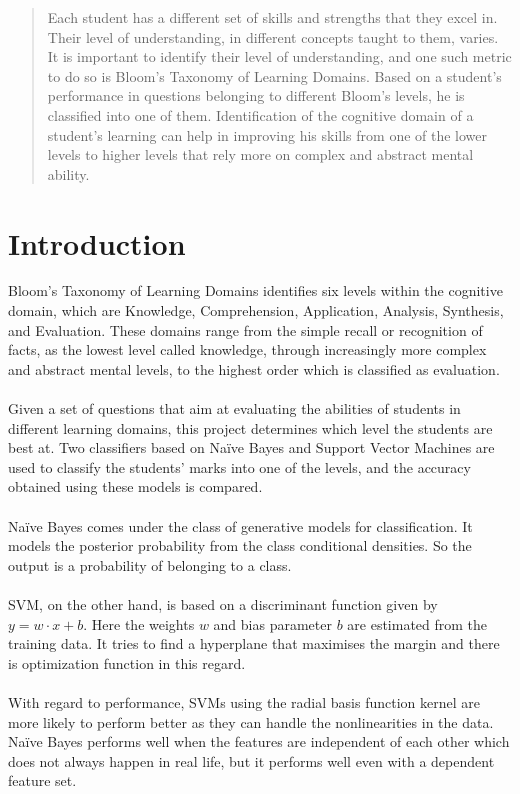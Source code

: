 \documentclass[12pt,oneside,a4paper]{article}
\providecommand\phantomsection{}
\begin{document}
	\null
	\vspace{\fill}

	\phantomsection
	\begin{abstract}
		\normalsize
		\doublespacing
		Each student has a different set of skills and strengths that they excel in. Their level of understanding, in different concepts taught to them, varies. It is important to identify their level of understanding, and one such metric to do so is Bloom's Taxonomy of Learning Domains. Based on a student's performance in questions belonging to different Bloom's levels, he is classified into one of them. Identification of the cognitive domain of a student's learning can help in improving his skills from one of the lower levels to higher levels that rely more on complex and abstract mental ability.
	\end{abstract}

	\vspace{\fill}
	\null
	\newpage

	\section{Introduction}
		Bloom's Taxonomy of Learning Domains identifies six levels within the cognitive domain, which are Knowledge, Comprehension, Application, Analysis, Synthesis, and Evaluation. These domains range from the simple recall or recognition of facts, as the lowest level called knowledge, through increasingly more complex and abstract mental levels, to the highest order which is classified as evaluation. \\
		\\
		Given a set of questions that aim at evaluating the abilities of students in different learning domains, this project determines which level the students are best at. Two classifiers based on Na\"ive Bayes and Support Vector Machines are used to classify the students' marks into one of the levels, and the accuracy obtained using these models is compared. \\
		\\
		Na\"ive Bayes comes under the class of generative models for classification. It models the posterior probability from the class conditional densities. So the output is a probability of belonging to a class. \\
		\\
		SVM, on the other hand, is based on a discriminant function given by $y = w \cdot x+b$. Here the weights $w$ and bias parameter $b$ are estimated from the training data. It tries to find a hyperplane that maximises the margin and there is optimization function in this regard. \\
		\\
		With regard to performance, SVMs using the radial basis function kernel are more likely to perform better as they can handle the nonlinearities in the data. Na\"ive Bayes performs well when the features are independent of each other which does not always happen in real life, but it performs well even with a dependent feature set.
\end{document}
